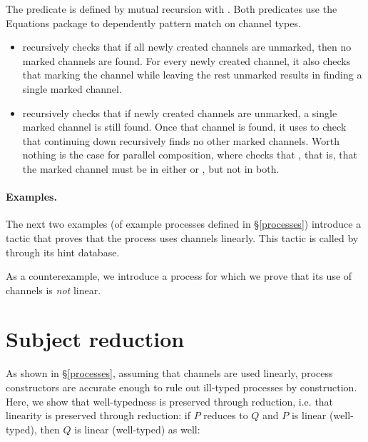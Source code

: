 \documentclass{mproj}
\begin{document}

The predicate  is defined by mutual recursion with . Both predicates use the Equations package to dependently pattern match on channel types.
\begin{itemize}
    \item {} recursively checks that if all newly created channels are unmarked, then no marked channels are found. For every newly created channel, it also checks that marking the channel while leaving the rest unmarked results in  finding a single marked channel.  

    \item {} recursively checks that if newly created channels are unmarked, a single marked channel is still found. Once that channel is found, it uses  to check that continuing down recursively finds no other marked channels. Worth nothing is the case for parallel composition, where  checks that , that is, that the marked channel must be in either  or , but not in both.
\end{itemize}

\paragraph{Examples.}

The next two examples (of example processes defined in \S \ref{processes}) introduce a tactic that proves that the process uses channels linearly. This tactic is called by  through its hint database.


As a counterexample, we introduce a process for which we prove that its use of channels is \emph{not} linear.


\section{Subject reduction}\label{subject-reduction}

As shown in \S \ref{processes}, assuming that channels are used linearly, process constructors are accurate enough to rule out ill-typed processes by construction. Here, we show that well-typedness is preserved through reduction, i.e. that linearity is preserved through reduction: if $P$ reduces to $Q$ and $P$ is linear (well-typed), then $Q$ is linear (well-typed) as well:
\end{document}
